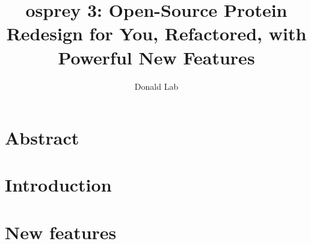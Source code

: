 \documentclass[11pt, oneside]{article}   	%
\title{{\sc osprey} 3: Open-Source Protein Redesign for You, Refactored, with Powerful New Features}
\author{Donald Lab}
\begin{document}
\maketitle

\section{Abstract}

\section{Introduction}


\section{New features}






\end{document}
